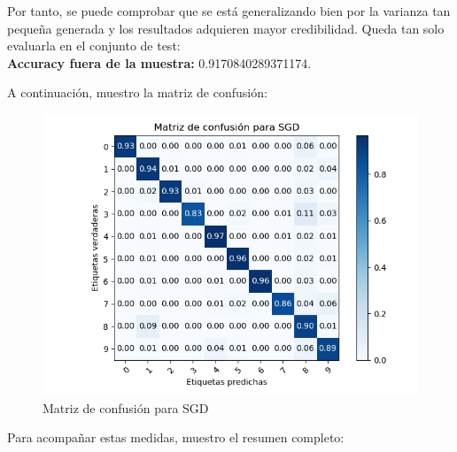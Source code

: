 Por tanto, se puede comprobar que se está generalizando bien por la varianza tan pequeña generada y los resultados adquieren mayor credibilidad. Queda tan solo evaluarla en el conjunto de test: \\

\textbf{Accuracy fuera de la muestra:} 0.9170840289371174.

A continuación, muestro la matriz de confusión:

\begin{figure}[H] %
	\centering
	\includegraphics[scale=0.8]{conf-m-sgd.png}  %
	\caption{Matriz de confusión para SGD} 
	\label{fig:conf-m-sgd}
\end{figure}

Para acompañar estas medidas, muestro el resumen completo:

